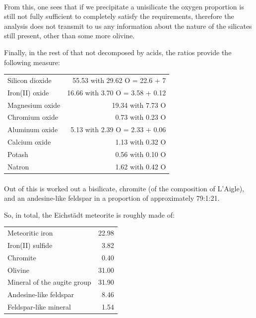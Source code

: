 \documentclass[a4paper, 12pt, oneside]{article}
\begin{document}
\paragraph*{}
From this, one sees that if we precipitate a unisilicate the oxygen proportion is still not fully sufficient to completely satisfy the requirements, therefore the analysis does not transmit to us any information about the nature of the silicates still present, other than some more olivine.

Finally, in the rest of that not decomposed by acids, the ratios provide the following measure:
\begin{center}
    \begin{tabular}{l r}
        Silicon dioxide & 55.53 with 29.62 O = 22.6 + 7\\
        Iron(II) oxide & 16.66 with 3.70 O = 3.58 + 0.12\\
        Magnesium oxide & 19.34 with 7.73 O\\
        Chromium oxide & 0.73 with 0.23 O\\
        Aluminum oxide & 5.13 with 2.39 O = 2.33 + 0.06\\
        Calcium oxide & 1.13 with 0.32 O\\
        Potash & 0.56 with 0.10 O\\
        Natron & 1.62 with 0.42 O\\
    \end{tabular}
\end{center}
\paragraph*{}
Out of this is worked out a bisilicate, chromite (of the composition of L'Aigle), and an andesine-like feldspar in a proportion of approximately 79:1:21.

So, in total, the Eichstädt meteorite is roughly made of:
\begin{center}
    \begin{tabular}{l r}
        Meteoritic iron & 22.98\\
        Iron(II) sulfide & 3.82\\
        Chromite & 0.40\\
        Olivine & 31.00\\
        Mineral of the augite\index{augite} group & 31.90\\
        Andesine-like feldspar & 8.46\\
        Feldspar-like mineral & 1.54\\
    \end{tabular}
\end{center}
\end{document}
